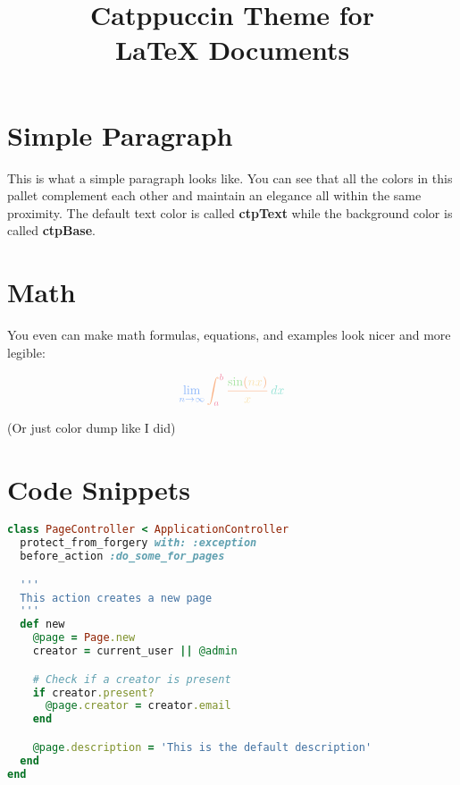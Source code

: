 \documentclass[12pt]{article}
\title{ \Huge \textbf{\textcolor{ctpPink}{Catppuccin Theme for} \\ \textcolor{ctpLavender}{\LaTeX{} Documents}} \vspace{-3em}}
\date{}
\begin{document}
\maketitle

\section{\textcolor{ctpSky}{Simple Paragraph}}
\textcolor{ctpYellow}{This is what a simple paragraph looks like.} You can see that all the colors in this pallet complement each other and maintain an elegance all within the same proximity. The default text color is called \textbf{\textcolor{ctpGreen}{ctpText}} while the background color is called \textbf{\textcolor{ctpGreen}{ctpBase}}.

\section{\textcolor{ctpSky}{Math}}

You even can make math formulas, equations, and examples look nicer and more legible:


\[\large{
    \textcolor{ctpBlue}{\lim_{{n \to \infty}} \textcolor{ctpPeach}{\int_{\textcolor{ctpRed}{a}}^{\textcolor{ctpRed}{b}} \frac{\textcolor{ctpGreen}{\sin}(\textcolor{ctpYellow}{nx})}{\textcolor{ctpYellow}{x}} \, \textcolor{ctpTeal}{dx}}}
}\]

\tiny{(Or just color dump like I did)}

\section{\textcolor{ctpSky}{Code Snippets}}

\begin{lstlisting}[language=Ruby,style=ruby_on_rails, caption={A ruby on rails code sample}]
class PageController < ApplicationController
  protect_from_forgery with: :exception
  before_action :do_some_for_pages

  '''
  This action creates a new page
  '''
  def new
    @page = Page.new
    creator = current_user || @admin

    # Check if a creator is present
    if creator.present?
      @page.creator = creator.email
    end

    @page.description = 'This is the default description'
  end
end
\end{lstlisting}
\end{document}
